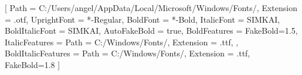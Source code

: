 \newcommand{\Exercises}{%
    \setcounter{exercise}{0}%
    \vskip0ex\kern4ex{\textbf{习题.}}%
}

\newcommand{\exercise}[1]{\refstepcounter{exercise}\vspace{.5em}\par\noindent{}习题\kern.5ex\theexercise.\kern.5em#1}

\def\theexercise{%
    \arabic{chapter}.\arabic{section}.\roman{exercise}
}

[
    Path = C:/Users/angel/AppData/Local/Microsoft/Windows/Fonts/,
    Extension = .otf,
    UprightFont = *-Regular,
    BoldFont = *-Bold,
    ItalicFont = SIMKAI,
    BoldItalicFont = SIMKAI,
    AutoFakeBold = true,
    BoldFeatures = {FakeBold=1.5},
    ItalicFeatures = {
        Path = C:/Windows/Fonts/,
        Extension = .ttf,
    },
    BoldItalicFeatures = {
        Path = C:/Windows/Fonts/,
        Extension = .ttf,
        FakeBold=1.8  %
    }
]
\setmainfont{CMU Serif}